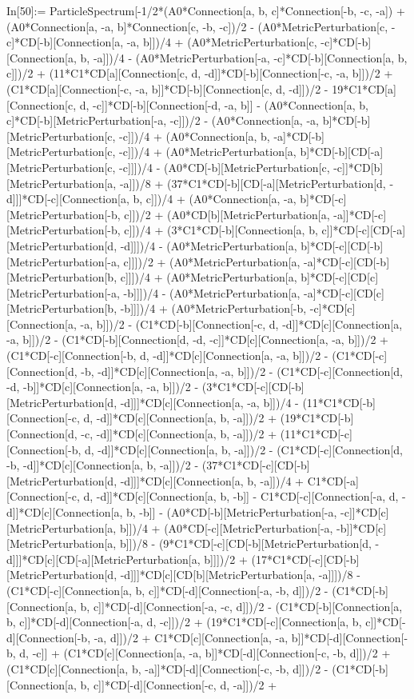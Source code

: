 In[50]:= ParticleSpectrum[-1/2*(A0*Connection[a, b, c]*Connection[-b, -c, -a]) + (A0*Connection[a, -a, b]*Connection[c, -b, -c])/2 - (A0*MetricPerturbation[c, -c]*CD[-b][Connection[a, -a, b]])/4 + (A0*MetricPerturbation[c, -c]*CD[-b][Connection[a, b, -a]])/4 - (A0*MetricPerturbation[-a, -c]*CD[-b][Connection[a, b, c]])/2 + (11*C1*CD[a][Connection[c, d, -d]]*CD[-b][Connection[-c, -a, b]])/2 + (C1*CD[a][Connection[-c, -a, b]]*CD[-b][Connection[c, d, -d]])/2 - 19*C1*CD[a][Connection[c, d, -c]]*CD[-b][Connection[-d, -a, b]] - (A0*Connection[a, b, c]*CD[-b][MetricPerturbation[-a, -c]])/2 - (A0*Connection[a, -a, b]*CD[-b][MetricPerturbation[c, -c]])/4 + (A0*Connection[a, b, -a]*CD[-b][MetricPerturbation[c, -c]])/4 + (A0*MetricPerturbation[a, b]*CD[-b][CD[-a][MetricPerturbation[c, -c]]])/4 - (A0*CD[-b][MetricPerturbation[c, -c]]*CD[b][MetricPerturbation[a, -a]])/8 + (37*C1*CD[-b][CD[-a][MetricPerturbation[d, -d]]]*CD[-c][Connection[a, b, c]])/4 + (A0*Connection[a, -a, b]*CD[-c][MetricPerturbation[-b, c]])/2 + (A0*CD[b][MetricPerturbation[a, -a]]*CD[-c][MetricPerturbation[-b, c]])/4 + (3*C1*CD[-b][Connection[a, b, c]]*CD[-c][CD[-a][MetricPerturbation[d, -d]]])/4 - (A0*MetricPerturbation[a, b]*CD[-c][CD[-b][MetricPerturbation[-a, c]]])/2 + (A0*MetricPerturbation[a, -a]*CD[-c][CD[-b][MetricPerturbation[b, c]]])/4 + (A0*MetricPerturbation[a, b]*CD[-c][CD[c][MetricPerturbation[-a, -b]]])/4 - (A0*MetricPerturbation[a, -a]*CD[-c][CD[c][MetricPerturbation[b, -b]]])/4 + (A0*MetricPerturbation[-b, -c]*CD[c][Connection[a, -a, b]])/2 - (C1*CD[-b][Connection[-c, d, -d]]*CD[c][Connection[a, -a, b]])/2 - (C1*CD[-b][Connection[d, -d, -c]]*CD[c][Connection[a, -a, b]])/2 + (C1*CD[-c][Connection[-b, d, -d]]*CD[c][Connection[a, -a, b]])/2 - (C1*CD[-c][Connection[d, -b, -d]]*CD[c][Connection[a, -a, b]])/2 - (C1*CD[-c][Connection[d, -d, -b]]*CD[c][Connection[a, -a, b]])/2 - (3*C1*CD[-c][CD[-b][MetricPerturbation[d, -d]]]*CD[c][Connection[a, -a, b]])/4 - (11*C1*CD[-b][Connection[-c, d, -d]]*CD[c][Connection[a, b, -a]])/2 + (19*C1*CD[-b][Connection[d, -c, -d]]*CD[c][Connection[a, b, -a]])/2 + (11*C1*CD[-c][Connection[-b, d, -d]]*CD[c][Connection[a, b, -a]])/2 - (C1*CD[-c][Connection[d, -b, -d]]*CD[c][Connection[a, b, -a]])/2 - (37*C1*CD[-c][CD[-b][MetricPerturbation[d, -d]]]*CD[c][Connection[a, b, -a]])/4 + C1*CD[-a][Connection[-c, d, -d]]*CD[c][Connection[a, b, -b]] - C1*CD[-c][Connection[-a, d, -d]]*CD[c][Connection[a, b, -b]] - (A0*CD[-b][MetricPerturbation[-a, -c]]*CD[c][MetricPerturbation[a, b]])/4 + (A0*CD[-c][MetricPerturbation[-a, -b]]*CD[c][MetricPerturbation[a, b]])/8 - (9*C1*CD[-c][CD[-b][MetricPerturbation[d, -d]]]*CD[c][CD[-a][MetricPerturbation[a, b]]])/2 + (17*C1*CD[-c][CD[-b][MetricPerturbation[d, -d]]]*CD[c][CD[b][MetricPerturbation[a, -a]]])/8 - (C1*CD[-c][Connection[a, b, c]]*CD[-d][Connection[-a, -b, d]])/2 - (C1*CD[-b][Connection[a, b, c]]*CD[-d][Connection[-a, -c, d]])/2 - (C1*CD[-b][Connection[a, b, c]]*CD[-d][Connection[-a, d, -c]])/2 + (19*C1*CD[-c][Connection[a, b, c]]*CD[-d][Connection[-b, -a, d]])/2 + C1*CD[c][Connection[a, -a, b]]*CD[-d][Connection[-b, d, -c]] + (C1*CD[c][Connection[a, -a, b]]*CD[-d][Connection[-c, -b, d]])/2 + (C1*CD[c][Connection[a, b, -a]]*CD[-d][Connection[-c, -b, d]])/2 - (C1*CD[-b][Connection[a, b, c]]*CD[-d][Connection[-c, d, -a]])/2 + 